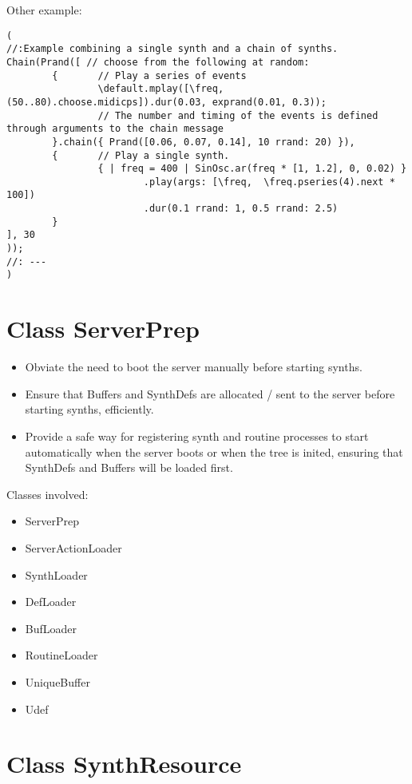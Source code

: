 \documentclass[11pt, a4paper]{scrartcl}
\begin{document}
Other example: 

\begin{verbatim}
(
//:Example combining a single synth and a chain of synths.
Chain(Prand([ // choose from the following at random:
        {       // Play a series of events
                \default.mplay([\freq, (50..80).choose.midicps]).dur(0.03, exprand(0.01, 0.3));
                // The number and timing of the events is defined through arguments to the chain message
        }.chain({ Prand([0.06, 0.07, 0.14], 10 rrand: 20) }),
        {       // Play a single synth.
                { | freq = 400 | SinOsc.ar(freq * [1, 1.2], 0, 0.02) }
                        .play(args: [\freq,  \freq.pseries(4).next * 100])
                        .dur(0.1 rrand: 1, 0.5 rrand: 2.5) 
        }
], 30
));
//: ---
)
\end{verbatim}
\section*{Class ServerPrep}
\label{sec-14}


\begin{itemize}
\item Obviate the need to boot the server manually before starting synths.
\item Ensure that Buffers and SynthDefs are allocated / sent to the server
  before starting synths, efficiently.
\item Provide a safe way for registering synth and routine processes to start automatically when the server boots
  or when the tree is inited, ensuring that SynthDefs and Buffers will be loaded first.
\end{itemize}

Classes involved: 

\begin{itemize}
\item ServerPrep
\item ServerActionLoader
\item SynthLoader
\item DefLoader
\item BufLoader
\item RoutineLoader
\item UniqueBuffer
\item Udef
\end{itemize}
\section*{Class SynthResource}
\label{sec-15}
\end{document}
